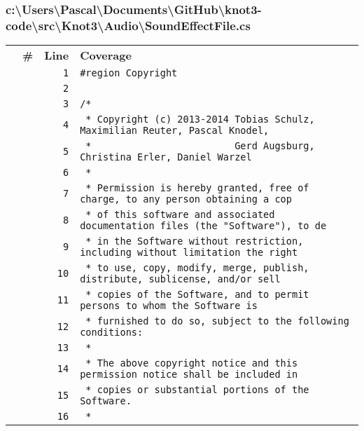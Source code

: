 \documentclass[a4paper,10pt]{article}
\begin{document}
\subsubsection{c:\textbackslash Users\textbackslash Pascal\textbackslash Documents\textbackslash GitHub\textbackslash knot3-code\textbackslash src\textbackslash Knot3\textbackslash Audio\textbackslash SoundEffectFile.cs}
\begin{longtable}[l]{lrrl}
\textbf{} & \textbf{\#} & \textbf{Line} & \textbf{Coverage}\\
\cellcolor{gray} &  & \verb~1~ & \verb~#region Copyright~\\
\cellcolor{gray} &  & \verb~2~ & \verb~~\\
\cellcolor{gray} &  & \verb~3~ & \verb~/*~\\
\cellcolor{gray} &  & \verb~4~ & \verb~ * Copyright (c) 2013-2014 Tobias Schulz, Maximilian Reuter, Pascal Knodel,~\\
\cellcolor{gray} &  & \verb~5~ & \verb~ *                         Gerd Augsburg, Christina Erler, Daniel Warzel~\\
\cellcolor{gray} &  & \verb~6~ & \verb~ *~\\
\cellcolor{gray} &  & \verb~7~ & \verb~ * Permission is hereby granted, free of charge, to any person obtaining a cop~\\
\cellcolor{gray} &  & \verb~8~ & \verb~ * of this software and associated documentation files (the "Software"), to de~\\
\cellcolor{gray} &  & \verb~9~ & \verb~ * in the Software without restriction, including without limitation the right~\\
\cellcolor{gray} &  & \verb~10~ & \verb~ * to use, copy, modify, merge, publish, distribute, sublicense, and/or sell~\\
\cellcolor{gray} &  & \verb~11~ & \verb~ * copies of the Software, and to permit persons to whom the Software is~\\
\cellcolor{gray} &  & \verb~12~ & \verb~ * furnished to do so, subject to the following conditions:~\\
\cellcolor{gray} &  & \verb~13~ & \verb~ *~\\
\cellcolor{gray} &  & \verb~14~ & \verb~ * The above copyright notice and this permission notice shall be included in ~\\
\cellcolor{gray} &  & \verb~15~ & \verb~ * copies or substantial portions of the Software.~\\
\cellcolor{gray} &  & \verb~16~ & \verb~ *~\\

\end{longtable}
\end{document}
